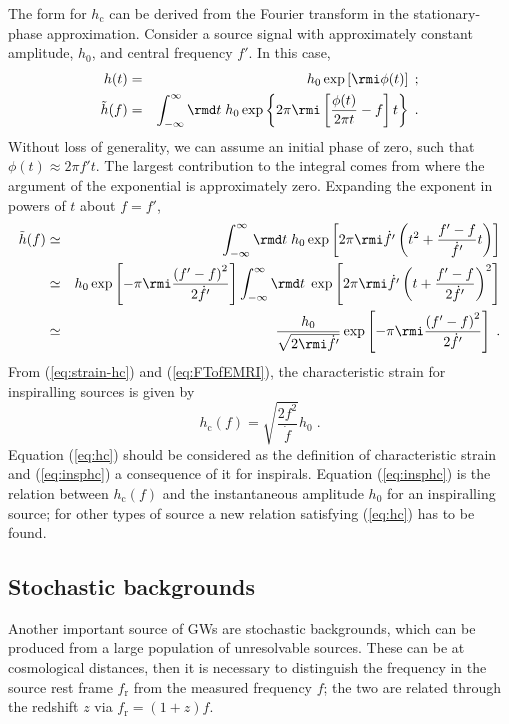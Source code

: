 The form for $h_\mathrm{c}$ can be derived from the Fourier transform in the stationary-phase approximation. Consider a source signal with approximately constant amplitude, $h_0$, and central frequency $f'$. In this case,
\begin{eqnarray}
h(t) &=& h_0\exp\left[\rmi \phi(t)\right] \; ; \\
\tilde{h}(f) &=& \int_{-\infty}^{\infty}\rmd t\; h_0\exp \left\{2\pi \rmi \left[\frac{\phi(t)}{2\pi t}-f\right]t\right\} \; .
\end{eqnarray}
Without loss of generality, we can assume an initial phase of zero, such that $\phi(t) \approx 2\pi f't$. The largest contribution to the integral comes from where the argument of the exponential is approximately zero. Expanding the exponent in powers of $t$ about $f = f'$,
\begin{eqnarray} \label{eq:FTofEMRI}
\tilde{h}(f) &\simeq& \int_{-\infty}^{\infty}\rmd t\; h_0 \exp\left[2\pi\rmi \dot{f'} \left(t^{2}+\frac{f'-f}{\dot{f'}}t\right)\right]\nonumber \\
&\simeq& h_0\exp\left[-\pi\rmi\frac{\left(f'-f\right)^{2}}{2\dot{f'}}\right]\int_{-\infty}^{\infty}\rmd t\;\exp\left[2\pi\rmi\dot{f'}\left(t+\frac{f'-f}{2\dot{f'}}\right)^{2}\right] \nonumber \\
&\simeq& \frac{h_0}{\sqrt{2\rmi\dot{f'}}}\exp\left[-\pi\rmi\frac{\left(f'-f\right)^{2}}{2\dot{f'}}\right]\; .
\end{eqnarray}
From (\ref{eq:strain-hc}) and (\ref{eq:FTofEMRI}), the characteristic strain for inspiralling sources is given by \citep{FinnThorne}
\begin{equation}\label{eq:insphc}
h_\mathrm{c}(f) = \sqrt{\frac{2f^{2}}{\dot{f}}}h_0 \;.
\end{equation}
Equation (\ref{eq:hc}) should be considered as the definition of characteristic strain and (\ref{eq:insphc}) a consequence of it for inspirals. Equation (\ref{eq:insphc}) is the relation between $h_\mathrm{c}(f)$ and the instantaneous amplitude $h_0$ for an inspiralling source; for other types of source a new relation satisfying (\ref{eq:hc}) has to be found.


\subsection{Stochastic backgrounds}\label{sec:stoch}

Another important source of GWs are stochastic backgrounds, which can be produced from a large population of unresolvable sources. These can be at cosmological distances, then it is necessary to distinguish the frequency in the source rest frame $f_{\mathrm{r}}$ from the measured frequency $f$; the two are related through the redshift $z$ via $f_{\mathrm{r}}=(1+z)f$.

